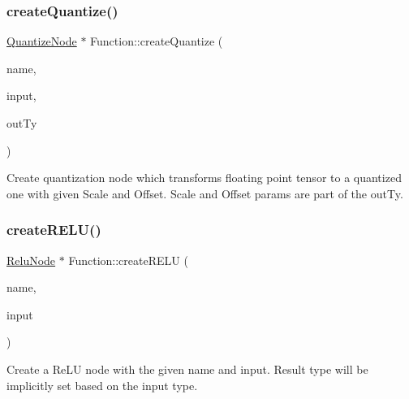 \subsubsection{\texorpdfstring{create\+Quantize()}{createQuantize()}}
{\footnotesize\ttfamily \hyperlink{classglow_1_1_quantize_node}{Quantize\+Node} $\ast$ Function\+::create\+Quantize (\begin{DoxyParamCaption}\item[{llvm\+::\+String\+Ref}]{name,  }\item[{\hyperlink{structglow_1_1_node_value}{Node\+Value}}]{input,  }\item[{\hyperlink{structglow_1_1_type}{Type\+Ref}}]{out\+Ty }\end{DoxyParamCaption})}

Create quantization node which transforms floating point tensor to a quantized one with given Scale and Offset. Scale and Offset params are part of the {\ttfamily out\+Ty}. \mbox{\label{classglow_1_1_function_ada1e5e0678dc0af5c17835ffea6c3367}} 
\subsubsection{\texorpdfstring{create\+R\+E\+L\+U()}{createRELU()}\hspace{0.1cm}{\footnotesize\ttfamily [1/2]}}
{\footnotesize\ttfamily \hyperlink{classglow_1_1_relu_node}{Relu\+Node} $\ast$ Function\+::create\+R\+E\+LU (\begin{DoxyParamCaption}\item[{llvm\+::\+String\+Ref}]{name,  }\item[{\hyperlink{structglow_1_1_node_value}{Node\+Value}}]{input }\end{DoxyParamCaption})}

Create a Re\+LU node with the given {\ttfamily name} and {\ttfamily input}. Result type will be implicitly set based on the {\ttfamily input} type. \mbox{\label{classglow_1_1_function_a31145d8863286195749705d53a93b9b0}} 
